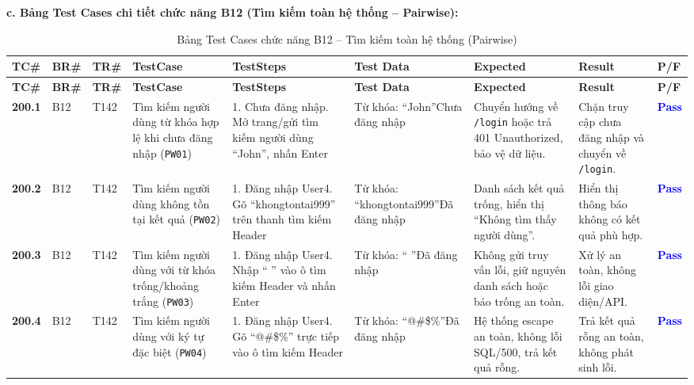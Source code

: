 \documentclass[11pt,a4paper]{article}
\begin{document}
\noindent\textbf{c. Bảng Test Cases chi tiết chức năng B12 (Tìm kiếm toàn hệ thống -- Pairwise):}
\begingroup
\scriptsize
\setlength{\tabcolsep}{3pt}
\renewcommand{\arraystretch}{0.92}
\begin{longtable}{|C{0.9cm}|C{0.7cm}|C{0.9cm}|L{2.0cm}|L{3.0cm}|L{2.2cm}|L{2.6cm}|L{2.5cm}|C{0.85cm}|}
\hline
{}
\textbf{TC\#} & \textbf{BR\#} & \textbf{TR\#} & \textbf{TestCase} & \textbf{TestSteps} & \textbf{Test Data} & \textbf{Expected} & \textbf{Result} & \textbf{P/F} \tabularnewline
\hline
\endfirsthead
\hline
{}
\textbf{TC\#} & \textbf{BR\#} & \textbf{TR\#} & \textbf{TestCase} & \textbf{TestSteps} & \textbf{Test Data} & \textbf{Expected} & \textbf{Result} & \textbf{P/F} \tabularnewline
\hline
\endhead
\hline
\endfoot
\hline
\caption{Bảng Test Cases chức năng B12 -- Tìm kiếm toàn hệ thống (Pairwise)}
\endlastfoot
\textbf{200.1} & B12 & T142 & Tìm kiếm người dùng từ khóa hợp lệ khi chưa đăng nhập (\texttt{PW01}) & 1. Chưa đăng nhập. Mở trang/gửi tìm kiếm người dùng ``John'', nhấn Enter & Từ khóa: ``John''\newline Chưa đăng nhập & Chuyển hướng về \texttt{/login} hoặc trả 401 Unauthorized, bảo vệ dữ liệu. & Chặn truy cập chưa đăng nhập và chuyển về \texttt{/login}. & \textcolor{blue}{\textbf{Pass}} \\ \hline
\textbf{200.2} & B12 & T142 & Tìm kiếm người dùng không tồn tại kết quả (\texttt{PW02}) & 1. Đăng nhập User4. Gõ ``khongtontai999'' trên thanh tìm kiếm Header & Từ khóa: ``khongtontai999''\newline Đã đăng nhập & Danh sách kết quả trống, hiển thị ``Không tìm thấy người dùng''. & Hiển thị thông báo không có kết quả phù hợp. & \textcolor{blue}{\textbf{Pass}} \\ \hline
\textbf{200.3} & B12 & T142 & Tìm kiếm người dùng với từ khóa trống/khoảng trắng (\texttt{PW03}) & 1. Đăng nhập User4. Nhập ``   '' vào ô tìm kiếm Header và nhấn Enter & Từ khóa: ``   ''\newline Đã đăng nhập & Không gửi truy vấn lỗi, giữ nguyên danh sách hoặc báo trống an toàn. & Xử lý an toàn, không lỗi giao diện/API. & \textcolor{blue}{\textbf{Pass}} \\ \hline
\textbf{200.4} & B12 & T142 & Tìm kiếm người dùng với ký tự đặc biệt (\texttt{PW04}) & 1. Đăng nhập User4. Gõ ``@\#\$\%'' trực tiếp vào ô tìm kiếm Header & Từ khóa: ``@\#\$\%''\newline Đã đăng nhập & Hệ thống escape an toàn, không lỗi SQL/500, trả kết quả rỗng. & Trả kết quả rỗng an toàn, không phát sinh lỗi. & \textcolor{blue}{\textbf{Pass}} \\ \hline

\end{longtable}
\end{document}

